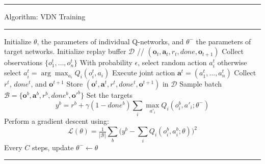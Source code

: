 \documentclass[varwidth, border=6pt]{standalone}
\begin{document}
\begingroup
\small                    %
\begin{center}
  \begin{minipage}{0.99\linewidth} %
    \hrule height 0.7pt
    \vspace{3pt}
    Algorithm: VDN Training
    \vspace{3pt}
    \hrule height 0.7pt
    \vspace{6pt}

    \begin{algorithmic}[1]
      \State Initialize $\theta$, the parameters of individual Q-networks, and $\theta^-$ the parameters of target networks.
      \State Initialize replay buffer $\mathcal{D}$ // $(\mathbf{o}_t,\mathbf{a}_t,r_t,done,\mathbf{o}_{t+1})$
        \State Collect observations $\{o^t_1,\dots,o^t_n\}$
          \State With probability $\epsilon$, select random action $a_i^t$
          \State otherwise select $a_i^t = \arg\max_{a_i} Q_i(o^t_i,a_i)$
        \EndFor
        \State Execute joint action $\mathbf{a}^t = (a_1^t,\dots,a_n^t)$
        \State Collect $r^t$, $done^t$, and $\mathbf{o}^{t+1}$
        \State Store $(\mathbf{o}^t,\mathbf{a}^t,r^t,done^t,\mathbf{o}^{t+1})$ in $\mathcal{D}$
          \State Sample batch $\mathcal{B} = \{\mathbf{o}^b,\mathbf{a}^b,r^b,done^b,\mathbf{o'}^{b}\}$
          \State Set the targets
          \Statex
          \[
            y^b = r^b + \gamma (1 - done^b)\sum_i \max_{a'_i} Q_i(o_i^b,a'_i;\theta^-)
          \]
          \State Perform a gradient descent using:
          \Statex
          \[
            \mathcal{L}(\theta)=\tfrac{1}{|\mathcal{B}|}\sum_b\Big(y^b-\sum_i Q_i(o_i^b,a_i^b;\theta)\Big)^2
          \]
          \State Every $C$ steps, update $\theta^- \leftarrow \theta$
        \EndIf
      \EndWhile
    \end{algorithmic}

    \vspace{6pt}
    \hrule height 0.7pt
  \end{minipage}
\end{center}
\endgroup
\end{document}
